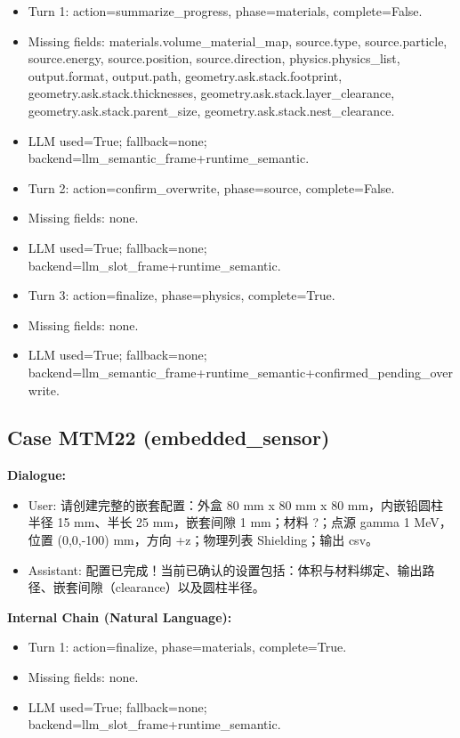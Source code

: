 \documentclass[11pt]{ctexart}
\begin{document}
\begin{itemize}
\item Turn 1: action=summarize\_progress, phase=materials, complete=False.
\item Missing fields: materials.volume\_material\_map, source.type, source.particle, source.energy, source.position, source.direction, physics.physics\_list, output.format, output.path, geometry.ask.stack.footprint, geometry.ask.stack.thicknesses, geometry.ask.stack.layer\_clearance, geometry.ask.stack.parent\_size, geometry.ask.stack.nest\_clearance.
\item LLM used=True; fallback=none; backend=llm\_semantic\_frame+runtime\_semantic.
\item Turn 2: action=confirm\_overwrite, phase=source, complete=False.
\item Missing fields: none.
\item LLM used=True; fallback=none; backend=llm\_slot\_frame+runtime\_semantic.
\item Turn 3: action=finalize, phase=physics, complete=True.
\item Missing fields: none.
\item LLM used=True; fallback=none; backend=llm\_semantic\_frame+runtime\_semantic+confirmed\_pending\_overwrite.
\end{itemize}
\subsection{Case MTM22 (embedded\_sensor)}
\textbf{Dialogue:}
\begin{itemize}
\item User: 请创建完整的嵌套配置：外盒 80 mm x 80 mm x 80 mm，内嵌铅圆柱半径 15 mm、半长 25 mm，嵌套间隙 1 mm；材料 ?；点源 gamma 1 MeV，位置 (0,0,-100) mm，方向 +z；物理列表 Shielding；输出 csv。
\item Assistant: 配置已完成！当前已确认的设置包括：体积与材料绑定、输出路径、嵌套间隙（clearance）以及圆柱半径。
\end{itemize}
\textbf{Internal Chain (Natural Language):}
\begin{itemize}
\item Turn 1: action=finalize, phase=materials, complete=True.
\item Missing fields: none.
\item LLM used=True; fallback=none; backend=llm\_slot\_frame+runtime\_semantic.
\end{itemize}
\end{document}
